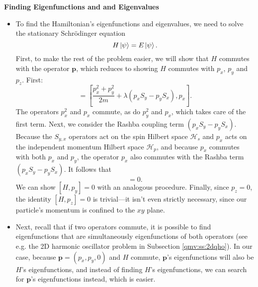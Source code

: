 \documentclass[11pt, a4paper]{article}
\newcommand{\Schro}{Schr\"{o}dinger\xspace}
\renewcommand{\vec}[1]{\bm{#1}} %
\renewcommand{\H}{\mathcal{H}}  %
\begin{document}
\textbf{Finding Eigenfunctions and and Eigenvalues}
\begin{itemize}
	
	\item To find the Hamiltonian's eigenfunctions and eigenvalues, we need to solve the stationary \Schro equation
	\begin{equation*}
		H \ket{\psi} = E \ket{\psi}.
	\end{equation*}
	First, to make the rest of the problem easier, we will show that $ H $ commutes with the operator $ \vec{p} $, which reduces to showing $ H $ commutes with $ p_{x}$, $ p_{y} $ and $ p_{z} $. First:
	\begin{equation*}
		[H, p_{x}] = \left[\frac{p_{x}^{2} + p_{y}^{2}}{2m} + \lambda (p_{x}S_{y} - p_{y}S_{x}), p_{x}\right].
	\end{equation*}
	The operators $ p_{x}^{2} $ and $ p_{x} $ commute, as do $ p_{y}^{2} $ and $ p_{x} $, which takes care of the first term. Next, we consider the Rashba coupling term $ (p_{x}S_{y} - p_{y}S_{x}) $. Because the $ S_{y, x} $ operators act on the spin Hilbert space $ \H_{s} $ and $ p_{x} $ acts on the independent momentum Hilbert space $ \H_{p} $, and because $ p_{x} $ commutes with both $ p_{x} $ and $ p_{y}$, the operator $ p_{x} $ also commutes with the Rashba term $ (p_{x}S_{y} - p_{y}S_{x}) $. It follows that
	\begin{equation*}
		[H, p_{x}] = 0.
	\end{equation*}
	We can show $ [H, p_{y}] = 0 $ with an analogous procedure. Finally, since $ p_{z} = 0 $, the identity $ [H, p_{z}] = 0 $ is trivial---it isn't even strictly necessary, since our particle's momentum is confined to the $ xy $ plane.
	
	\item Next, recall that if two operators commute, it is possible to find eigenfunctions that are simultaneously eigenfunctions of both operators (see e.g. the 2D harmonic oscillator problem in Subsection \ref{qmv:ss:2dqho}). In our case, because $ \vec{p} = (p_{x}, p_{y}, 0)$ and $ H $ commute, $ \vec{p} $'s eigenfunctions will also be $ H $'s eigenfunctions, and instead of finding $ H $'s eigenfunctions, we can search for $ \vec{p} $'s eigenfunctions instead, which is easier.
	

\end{itemize}
\end{document}
